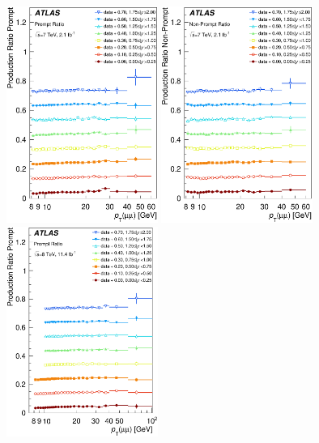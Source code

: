 \begin{description}[style=unboxed,leftmargin=0cm]
\begin{figure} [!ht]
  \begin{center}
    \includegraphics[width=0.44\textwidth]{figures/ct_7TeV_P_Ratio.eps} 
    \includegraphics[width=0.44\textwidth]{figures/ct_7TeV_NP_Ratio.eps}\hfil\\
    \includegraphics[width=0.44\textwidth]{figures/ct_8TeV_P_Ratio.eps}

\end{center}
\end{figure}
\end{description}
